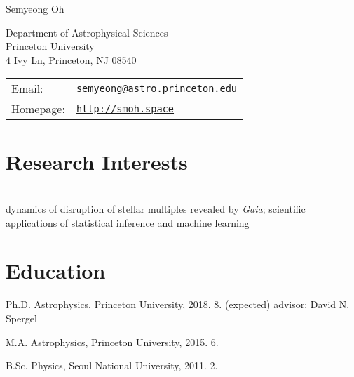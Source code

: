 \documentclass[11pt,letterpaper]{article}
\def\name{Semyeong Oh}
\renewenvironment{itemize}{
  \begin{list}{}{
    \setlength{\leftmargin}{1.5em}
  }
}{
  \end{list}
}
\begin{document}
{\huge \name}


\vspace{0.1in}

\begin{minipage}{0.45\linewidth}
  Department of Astrophysical Sciences \\
  Princeton University \\
  4 Ivy Ln, Princeton, NJ 08540
\end{minipage}
\begin{minipage}{0.45\linewidth}
  \begin{tabular}{ll}
    Email: & \href{mailto:semyeong@astro.princeton.edu}{\tt semyeong@astro.princeton.edu}\\
    Homepage: & \href{http://smoh.space}{\tt http://smoh.space} \\
  \end{tabular}
\end{minipage}


\section*{Research Interests}~\\

\vspace{-0.3cm}
dynamics of disruption of stellar multiples revealed by {\it Gaia};
scientific applications of statistical inference and machine learning

\section*{Education}

\begin{itemize}
  \setlength\itemsep{0.2em}
  \item Ph.D. Astrophysics, Princeton University, 2018. 8. (expected)
    advisor: David N. Spergel

  \item M.A. Astrophysics, Princeton University, 2015. 6.


  \item B.Sc. Physics, Seoul National University, 2011. 2.
\end{itemize}
\end{document}
